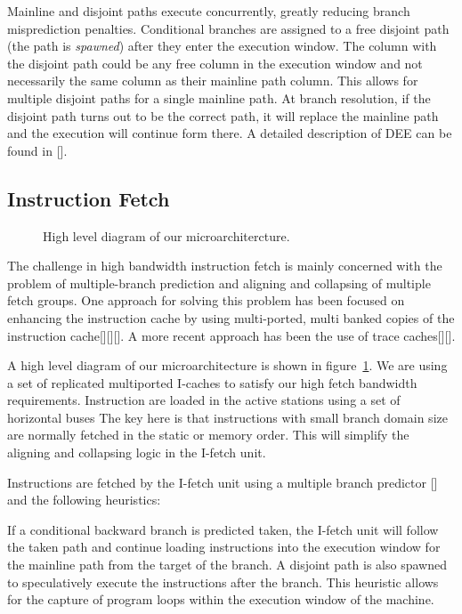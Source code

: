 \documentclass[10pt,twocolumn]{IEEEtran}
\begin{document}
Mainline and disjoint paths execute concurrently, greatly reducing
branch misprediction penalties.  Conditional branches are assigned to a
free disjoint path (the path is \emph{spawned}) after they enter the
execution window.  The column with the disjoint path could be any free
column in the execution window and not necessarily the same column as
their mainline path column. This allows for multiple disjoint paths for
a single mainline path.  At branch resolution,  if the disjoint path
turns out to be the correct path, it will replace the mainline path and
the execution will continue form there. A detailed description of DEE
can be found in [].

\subsection {Instruction Fetch}

\begin{figure}
{}
\caption{High level diagram of our microarchitercture.}
\label{fig:highlevel}
\end{figure}  
 
The challenge in high bandwidth instruction fetch is mainly concerned
with the problem of multiple-branch prediction and aligning and
collapsing of multiple fetch groups.  One approach for solving this
problem has been focused on enhancing the instruction cache by using
multi-ported, multi banked copies of the instruction cache[][][].  A
more recent approach has been the use of trace caches[][].

A high level diagram of our microarchitecture is shown in
figure~\ref{fig:highlevel}.  We are using a set of replicated
multiported I-caches to satisfy our high fetch bandwidth requirements.
Instruction are loaded in the active stations using a set of horizontal
buses  The key here is that instructions with small branch domain size
are normally fetched in the static or memory order.  This will simplify
the aligning and collapsing logic in the I-fetch unit.

Instructions are fetched by the I-fetch unit using a multiple branch
predictor [] and the following heuristics:

If a conditional backward branch is predicted taken, the I-fetch unit
will follow the taken path and continue loading instructions into the
execution window for the mainline path from the target of the branch.
A disjoint path is also spawned to speculatively execute the
instructions after the branch.  This heuristic allows for the capture
of program loops within the execution window of the machine.
\end{document}
